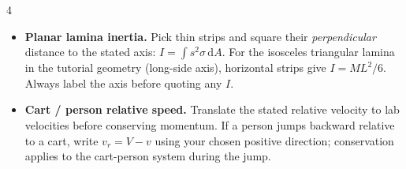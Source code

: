 \documentclass[10pt,landscape]{article}
\newcommand{\dd}{\,\mathrm d}
\begin{document}
\begin{multicols*}{4}
\begin{itemize}
    \item \textbf{Planar lamina inertia.} Pick thin strips and square their \emph{perpendicular} distance to the stated axis: $I=\int s^2\sigma\dd A$. For the isosceles triangular lamina in the tutorial geometry (long-side axis), horizontal strips give $I=ML^2/6$. Always label the axis before quoting any $I$.
    \item \textbf{Cart / person relative speed.} Translate the stated relative velocity to lab velocities before conserving momentum. If a person jumps backward relative to a cart, write $v_r=V-v$ using your chosen positive direction; conservation applies to the cart-person system during the jump.
\end{itemize}

\end{multicols*}
\end{document}
